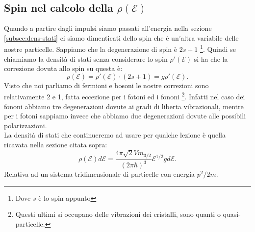 \subsection{Spin nel calcolo della $\rho ( \mathcal{E} ) $}%
Quando a partire dagli impulsi siamo passati all'energia nella sezione \ref{subsec:dens-stati} ci siamo dimenticati dello spin che è un'altra variabile delle nostre particelle. Sappiamo che la degenerazione di spin è $2s+1$ \footnote{Dove $s$ è lo spin appunto}. Quindi se chiamiamo la densità di stati senza considerare lo spin $\rho '( \mathcal{E} ) $ si ha che la correzione dovuta allo spin su questa è: 
\[
	\rho ( \mathcal{E} ) = \rho'( \mathcal{E} ) \cdot  \left( 2s + 1 \right)   = g \rho '( \mathcal{E} ) 
.\] 
Visto che noi parliamo di fermioni e bosoni le nostre correzioni sono relativamente 2 e 1, fatta eccezione per i fotoni ed i fononi \footnote{Questi ultimi si occupano delle vibrazioni dei cristalli, sono quanti o quasi-particelle.}.
Infatti nel caso dei fononi abbiamo tre degenerazioni dovute ai gradi di liberta vibrazionali, mentre per i fotoni sappiamo invece che abbiamo due degenerazioni dovute alle possibili polarizzazioni.\\
La densità di stati che continueremo ad usare per qualche lezione è quella ricavata nella sezione citata sopra:
\[
	\rho ( \mathcal{E} ) d\mathcal{E} = \frac{4\pi\sqrt{2} V m_{3 /2}}{\left( 2\pi \hbar \right)^3 } \mathcal{E} ^{1 /2} g d\mathcal{E} 
.\] 
Relativa ad un sistema tridimensionale di particelle con energia $p^2/2m$.

